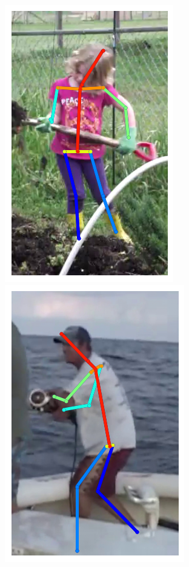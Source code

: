 \begin{figure}[t!]
    \includegraphics[height=\flowhh]{resources/Human_Poses/qualitative/img-8}
    \hfill
    \includegraphics[height=\flowhh]{resources/Human_Poses/qualitative/img-10}
    \hfill

\end{figure}

